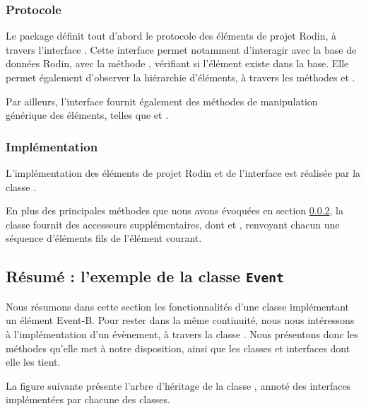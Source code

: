 \subsubsection{Protocole}

Le package  définit tout d'abord le protocole des éléments de projet Rodin, à travers l'interface .
Cette interface permet notamment d'interagir avec la base de données Rodin, avec la méthode , vérifiant si l'élément existe dans la base.
Elle permet également d'observer la hiérarchie d'éléments, à travers les méthodes  et .

Par ailleurs, l'interface  fournit également des méthodes de manipulation générique des éléments, telles que  et %
.


\subsubsection{Implémentation}\label{sec:rodinProjectElementProtocol}

L'implémentation des éléments de projet Rodin et de l'interface  est réalisée par la classe .

En plus des principales méthodes que nous avons évoquées en section \ref{sec:rodinProjectElementProtocol}, la classe  fournit %
des accesseurs supplémentaires, dont  et , renvoyant chacun une séquence d'éléments fils de l'élément courant.


\subsection{Résumé : l'exemple de la classe \texttt{Event}}\label{sec:rodinApiSummaryEvent}

Nous résumons dans cette section les fonctionnalités d'une classe implémentant un élément Event-B.
Pour rester dans la même continuité, nous nous intéressons à l'implémentation d'un évènement, à travers la classe .
Nous présentons donc les méthodes qu'elle met à notre disposition, ainsi que les classes et interfaces dont elle les tient.

La figure suivante présente l'arbre d'héritage de la classe , annoté des interfaces implémentées par chacune des classes.

